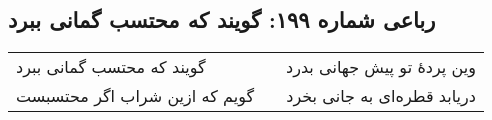 \begin{center}
\section*{رباعی شماره ۱۹۹: گویند که محتسب گمانی ببرد}
\label{sec:sh199}
\begin{longtable}{l p{0.5cm} r}
گویند که محتسب گمانی ببرد
&&
وین پردهٔ تو پیش جهانی بدرد
\\
گویم که ازین شراب اگر محتسبست
&&
دریابد قطره‌ای به جانی بخرد
\\
\end{longtable}
\end{center}
